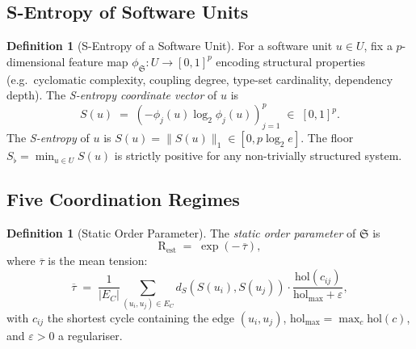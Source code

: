 \documentclass[12pt,a4paper,twocolumn]{article}
\theoremstyle{plain}
\theoremstyle{definition}
\newtheorem{definition}[theorem]{Definition}
\theoremstyle{remark}
\newcommand{\Scoord}{S}
\newcommand{\dS}{d_S}
\newcommand{\Rest}{\mathrm{R}_{\mathrm{est}}}
\newcommand{\hol}{\mathrm{hol}}
\begin{document}
\subsection{S-Entropy of Software Units}

\begin{definition}[S-Entropy of a Software Unit]
\label{def:s-entropy-software}
For a software unit $u \in U$, fix a $p$-dimensional feature map
$\phi_\mathfrak{S} : U \to [0,1]^p$ encoding structural properties
(e.g.\ cyclomatic complexity, coupling degree, type-set cardinality,
dependency depth).  The \emph{S-entropy coordinate vector} of $u$ is
\begin{equation}
  \Scoord(u) \;=\; \left(-\phi_j(u)\log_2\phi_j(u)\right)_{j=1}^p
    \;\in\; [0,1]^p.
\end{equation}
The \emph{S-entropy} of $u$ is $S(u) = \|\Scoord(u)\|_1 \in [0, p\log_2 e]$.
The floor $S_{\flat} = \min_{u \in U} S(u)$ is strictly positive for any
non-trivially structured system.
\end{definition}

\subsection{Five Coordination Regimes}

\begin{definition}[Static Order Parameter]
\label{def:order-parameter}
The \emph{static order parameter} of $\mathfrak{S}$ is
\begin{equation}
  \Rest \;=\; \exp\!\left(-\,\overline{\tau}\right),
\end{equation}
where $\overline{\tau}$ is the mean tension:
\begin{equation}
  \overline{\tau} \;=\; \frac{1}{|E_C|} \sum_{(u_i, u_j) \in E_C}
    \dS(S(u_i), S(u_j)) \cdot \frac{\hol(c_{ij})}{\hol_{\max} + \varepsilon},
\end{equation}
with $c_{ij}$ the shortest cycle containing the edge $(u_i,u_j)$,
$\hol_{\max} = \max_c \hol(c)$, and $\varepsilon > 0$ a regulariser.
\end{definition}
\end{document}
